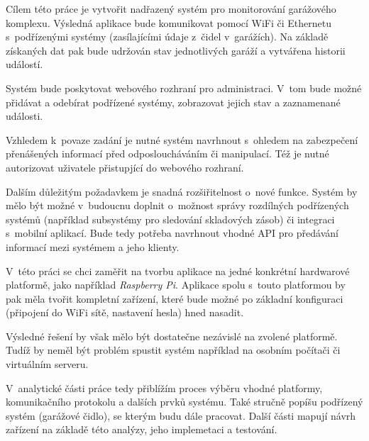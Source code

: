 Cílem této práce je vytvořit nadřazený systém pro monitorování garážového komplexu. Výsledná aplikace bude komunikovat pomocí WiFi či Ethernetu s~podřízenými systémy (zasílajícími údaje z~čidel v~garážích). Na základě získaných dat pak bude udržován stav jednotlivých garáží a vytvářena historii událostí.

Systém bude poskytovat webového rozhraní pro administraci. V~tom bude možné přidávat a odebírat podřízené systémy, zobrazovat jejich stav a zaznamenané události.

Vzhledem k~povaze zadání je nutné systém navrhnout s~ohledem na zabezpečení přenášených informací před odposloucháváním či manipulací. Též je nutné autorizovat uživatele přistupjící do webového rozhraní.

Dalším důležitým požadavkem je snadná rozšiřitelnost o~nové funkce. Systém by mělo být možné v~budoucnu doplnit o~možnost správy rozdílných podřízených systémů (například subsystémy pro sledování skladových zásob) či integraci s~mobilní aplikací. Bude tedy potřeba navrhnout vhodné API pro předávání informací mezi systémem a jeho klienty. 

V~této práci se chci zaměřit na tvorbu aplikace na jedné konkrétní hardwarové platformě, jako například \textit{Raspberry Pi}. Aplikace spolu s~touto platformou by pak měla tvořit kompletní zařízení, které bude možné po základní konfiguraci (připojení do WiFi sítě, nastavení hesla) hned nasadit.

Výsledné řešení by však mělo být dostatečne nezávislé na zvolené platformě. Tudíž by neměl být problém spustit systém například na osobním počítači či virtuálním serveru.

V~analytické části práce tedy přiblížím proces výběru vhodné platformy, komunikačního protokolu a dalších prvků systému. Také stručně popíšu podřízený systém (garážové čidlo), se kterým budu dále pracovat. Další části mapují návrh zařízení na základě této analýzy, jeho implemetaci a testování.